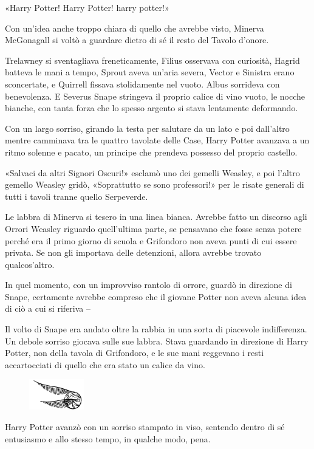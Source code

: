«Harry Potter! Harry Potter! harry potter!»

Con un’idea anche troppo chiara di quello che avrebbe visto, Minerva McGonagall si voltò a guardare dietro di sé il resto del Tavolo d’onore.

Trelawney si sventagliava freneticamente, Filius osservava con curiosità, Hagrid batteva le mani a tempo, Sprout aveva un’aria severa, Vector e Sinistra erano sconcertate, e Quirrell fissava stolidamente nel vuoto. Albus sorrideva con benevolenza. E Severus Snape stringeva il proprio calice di vino vuoto, le nocche bianche, con tanta forza che lo spesso argento si stava lentamente deformando.

Con un largo sorriso, girando la testa per salutare da un lato e poi dall’altro mentre camminava tra le quattro tavolate delle Case, Harry Potter avanzava a un ritmo solenne e pacato, un principe che prendeva possesso del proprio castello.

«Salvaci da altri Signori Oscuri!» esclamò uno dei gemelli Weasley, e poi l’altro gemello Weasley gridò, «Soprattutto se sono professori!» per le risate generali di tutti i tavoli tranne quello Serpeverde.

Le labbra di Minerva si tesero in una linea bianca. Avrebbe fatto un discorso agli Orrori Weasley riguardo quell’ultima parte, se pensavano che fosse senza potere perché era il primo giorno di scuola e Grifondoro non aveva punti di cui essere privata. Se non gli importava delle detenzioni, allora avrebbe trovato qualcos’altro.

In quel momento, con un improvviso rantolo di orrore, guardò in direzione di Snape, certamente avrebbe compreso che il giovane Potter non aveva alcuna idea di ciò a cui si riferiva –

Il volto di Snape era andato oltre la rabbia in una sorta di piacevole indifferenza. Un debole sorriso giocava sulle sue labbra. Stava guardando in direzione di Harry Potter, non della tavola di Grifondoro, e le sue mani reggevano i resti accartocciati di quello che era stato un calice da vino.

\begin{figure}[h!]
        \includegraphics[scale=0.4]{boccino.png}
        \centering
\end{figure}

Harry Potter avanzò con un sorriso stampato in viso, sentendo dentro di sé entusiasmo e allo stesso tempo, in qualche modo, pena.

